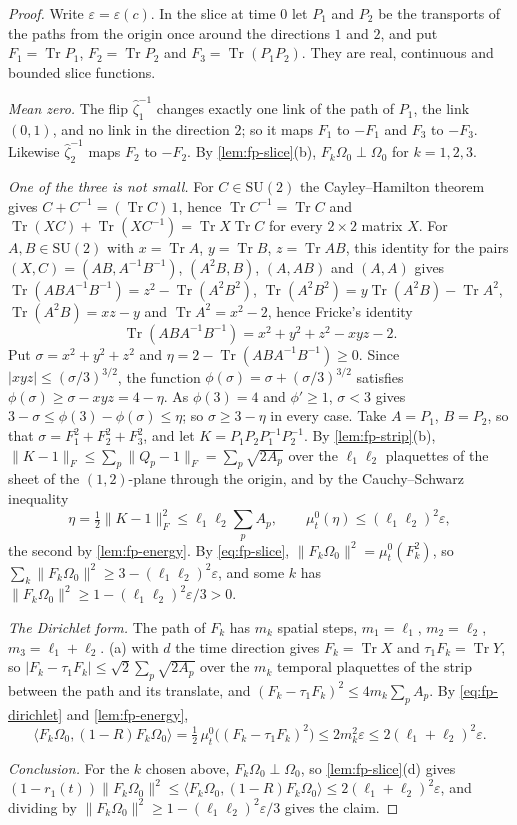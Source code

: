 \documentclass[11pt,a4paper]{amsart}
\theoremstyle{definition}
\theoremstyle{remark}
\numberwithin{equation}{section}
\DeclareMathOperator{\Tr}{Tr}        %
\newcommand{\ip}[2]{\langle #1,#2\rangle}  %
\newcommand{\norm}[1]{\lVert #1\rVert}     %
\newcommand{\abs}[1]{\lvert #1\rvert}      %
\newcommand{\SU}{\mathrm{SU}}              %
\newcommand{\Omegazero}{\Omega_0}          %
\begin{document}
\begin{proof}
Write $\varepsilon=\varepsilon(c)$. In the slice at time $0$ let $P_1$ and $P_2$ be the transports of the paths from the origin once around the directions $1$ and $2$, and put $F_1=\Tr P_1$, $F_2=\Tr P_2$ and $F_3=\Tr(P_1P_2)$. They are real, continuous and bounded slice functions.

\emph{Mean zero.} The flip $\hat\zeta_1^{-1}$ changes exactly one link of the path of $P_1$, the link $(0,1)$, and no link in the direction $2$; so it maps $F_1$ to $-F_1$ and $F_3$ to $-F_3$. Likewise $\hat\zeta_2^{-1}$ maps $F_2$ to $-F_2$. By \cref{lem:fp-slice}(b), $F_k\Omegazero\perp\Omegazero$ for $k=1,2,3$.

\emph{One of the three is not small.} For $C\in\SU(2)$ the Cayley--Hamilton theorem gives $C+C^{-1}=(\Tr C)\,1$, hence $\Tr C^{-1}=\Tr C$ and $\Tr(XC)+\Tr(XC^{-1})=\Tr X\Tr C$ for every $2\times2$ matrix $X$. For $A,B\in\SU(2)$ with $x=\Tr A$, $y=\Tr B$, $z=\Tr AB$, this identity for the pairs $(X,C)=(AB,A^{-1}B^{-1})$, $(A^2B,B)$, $(A,AB)$ and $(A,A)$ gives $\Tr(ABA^{-1}B^{-1})=z^2-\Tr(A^2B^2)$, $\Tr(A^2B^2)=y\Tr(A^2B)-\Tr A^2$, $\Tr(A^2B)=xz-y$ and $\Tr A^2=x^2-2$, hence Fricke's identity
\[
\Tr(ABA^{-1}B^{-1})=x^2+y^2+z^2-xyz-2 .
\]
Put $\sigma=x^2+y^2+z^2$ and $\eta=2-\Tr(ABA^{-1}B^{-1})\ge0$. Since $\abs{xyz}\le(\sigma/3)^{3/2}$, the function $\phi(\sigma)=\sigma+(\sigma/3)^{3/2}$ satisfies $\phi(\sigma)\ge\sigma-xyz=4-\eta$. As $\phi(3)=4$ and $\phi'\ge1$, $\sigma<3$ gives $3-\sigma\le\phi(3)-\phi(\sigma)\le\eta$; so $\sigma\ge3-\eta$ in every case. Take $A=P_1$, $B=P_2$, so that $\sigma=F_1^2+F_2^2+F_3^2$, and let $K=P_1P_2P_1^{-1}P_2^{-1}$. By \cref{lem:fp-strip}(b), $\norm{K-1}_F\le\sum_p\norm{Q_p-1}_F=\sum_p\sqrt{2A_p}$ over the $\ell_1\ell_2$ plaquettes of the sheet of the $(1,2)$-plane through the origin, and by the Cauchy--Schwarz inequality
\[
\eta=\tfrac12\norm{K-1}_F^2\le\ell_1\ell_2\sum_pA_p,\qquad \mu^0_t(\eta)\le(\ell_1\ell_2)^2\varepsilon,
\]
the second by \cref{lem:fp-energy}. By \eqref{eq:fp-slice}, $\norm{F_k\Omegazero}^2=\mu^0_t(F_k^2)$, so $\sum_k\norm{F_k\Omegazero}^2\ge3-(\ell_1\ell_2)^2\varepsilon$, and some $k$ has $\norm{F_k\Omegazero}^2\ge1-(\ell_1\ell_2)^2\varepsilon/3>0$.

\emph{The Dirichlet form.} The path of $F_k$ has $m_k$ spatial steps, $m_1=\ell_1$, $m_2=\ell_2$, $m_3=\ell_1+\ell_2$. (a) with $d$ the time direction gives $F_k=\Tr X$ and $\tau_1F_k=\Tr Y$, so $\abs{F_k-\tau_1F_k}\le\sqrt2\sum_p\sqrt{2A_p}$ over the $m_k$ temporal plaquettes of the strip between the path and its translate, and $(F_k-\tau_1F_k)^2\le4m_k\sum_pA_p$. By \eqref{eq:fp-dirichlet} and \cref{lem:fp-energy},
\[
\ip{F_k\Omegazero}{(1-R)F_k\Omegazero}=\tfrac12\,\mu^0_t\bigl((F_k-\tau_1F_k)^2\bigr)\le2m_k^2\varepsilon\le2(\ell_1+\ell_2)^2\varepsilon .
\]

\emph{Conclusion.} For the $k$ chosen above, $F_k\Omegazero\perp\Omegazero$, so \cref{lem:fp-slice}(d) gives $(1-r_1(t))\norm{F_k\Omegazero}^2\le\ip{F_k\Omegazero}{(1-R)F_k\Omegazero}\le2(\ell_1+\ell_2)^2\varepsilon$, and dividing by $\norm{F_k\Omegazero}^2\ge1-(\ell_1\ell_2)^2\varepsilon/3$ gives the claim.
\end{proof}
\end{document}
